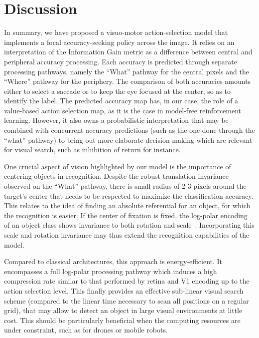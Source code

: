 \section{Discussion}
\label{sec:discussion}



In summary, we have proposed a visuo-motor action-selection model that implements a focal accuracy-seeking policy across the image. It relies on an interpretation of the Information Gain metric as a difference between central and peripheral accuracy processing. Each accuracy is predicted through separate processing pathways, namely the ``What'' pathway for the central pixels and the ``Where'' pathway for the periphery.  The comparison of both accuracies amounts either to select a saccade or to keep the eye focused at the center, so as to identify the label. The predicted accuracy map has, in our case, the role of a value-based action selection map, as it is the case in model-free reinforcement learning. However, it also owns a probabilistic interpretation that may be combined with concurrent accuracy predictions (such as the one done through the ``what'' pathway) to bring out more elaborate decision making which are relevant for visual search, such as inhibition of return for instance. 

One crucial aspect of vision highlighted by our model is the importance of centering objects in recognition. Despite the robust translation invariance observed on the ``What'' pathway, there is small radius of 2-3 pixels around the target's center that needs to be respected to maximize the classification accuracy. This relates to the idea of finding an absolute referential for an object, for which the recognition is easier. If the center of fixation is fixed, the log-polar encoding of an object class shows invariance to both rotation and scale~\citep{Traver10}. Incorporating this scale and rotation invariance may thus extend the recognition capabilities of the model.


Compared to classical architectures, this approach is energy-efficient. It encompasses a full log-polar processing pathway which induces a high compression rate similar to that performed by retina and V1 encoding up to the action selection level. This finally provides an effective sub-linear visual search scheme (compared to the linear time necessary to scan all positions on a regular grid), that may allow to detect an object in large visual environments at little cost. This should be particularly beneficial when the computing resources are under constraint, such as for drones or mobile robots. 

